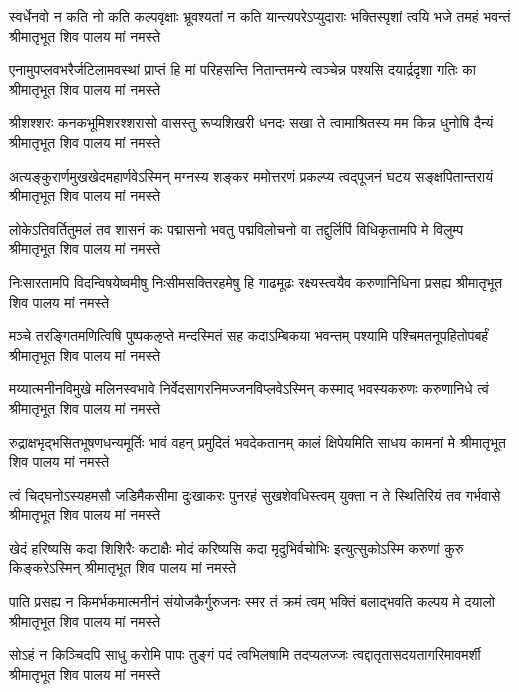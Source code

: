 \fourlineindentedshloka
{स्वर्धेनवो न कति नो कति कल्पवृक्षाः}
{भ्रूवश्यतां न कति यान्त्यपरेऽप्युदाराः}
{भक्तिस्पृशां त्वयि भजे तमहं भवन्तं}
{श्रीमातृभूत शिव पालय मां नमस्ते} %

\fourlineindentedshloka
{एनामुपप्लवभरैर्जटिलामवस्थां}
{प्राप्तं हि मां परिहसन्ति नितान्तमन्ये}
{त्वञ्चेन्न पश्यसि दयार्द्रदृशा गतिः का}
{श्रीमातृभूत शिव पालय मां नमस्ते} %

\fourlineindentedshloka
{श्रीशश्शरः कनकभूमिशरश्शरासो}
{वासस्तु रूप्यशिखरी धनदः सखा ते}
{त्वामाश्रितस्य मम किन्न धुनोषि दैन्यं}
{श्रीमातृभूत शिव पालय मां नमस्ते} %

\fourlineindentedshloka
{अत्यङ्कुरार्णमुखखेदमहार्णवेऽस्मिन्}
{मग्नस्य शङ्कर ममोत्तरणं प्रकल्प्य}
{त्वद्पूजनं घटय सङ्क्षपितान्तरायं}
{श्रीमातृभूत शिव पालय मां नमस्ते} %

\fourlineindentedshloka
{लोकेऽतिवर्तितुमलं तव शासनं कः}
{पद्मासनो भवतु पद्मविलोचनो वा}
{तद्दुर्लिपिं विधिकृतामपि मे विलुम्प}
{श्रीमातृभूत शिव पालय मां नमस्ते} %

\fourlineindentedshloka
{निःसारतामपि विदन्विषयेष्वमीषु}
{निःसीमसक्तिरहमेषु हि गाढमूढः}
{रक्ष्यस्त्वयैव करुणानिधिना प्रसह्य}
{श्रीमातृभूत शिव पालय मां नमस्ते} %

\fourlineindentedshloka
{मञ्चे तरङ्गितमणित्विषि पुष्पकऌप्ते}
{मन्दस्मितं सह कदाऽम्बिकया भवन्तम्}
{पश्यामि पश्चिमतनूपहितोपबर्हं}
{श्रीमातृभूत शिव पालय मां नमस्ते} %

\fourlineindentedshloka
{मय्यात्मनीनविमुखे मलिनस्वभावे}
{निर्वेदसागरनिमज्जनविप्लवेऽस्मिन्}
{कस्माद् भवस्यकरुणः करुणानिधे त्वं}
{श्रीमातृभूत शिव पालय मां नमस्ते} %

\fourlineindentedshloka
{रुद्राक्षभृद्भसितभूषणधन्यमूर्तिः}
{भावं वहन् प्रमुदितं भवदेकतानम्}
{कालं क्षिपेयमिति साधय कामनां मे}
{श्रीमातृभूत शिव पालय मां नमस्ते} %

\fourlineindentedshloka
{त्वं चिद्घनोऽस्यहमसौ जडिमैकसीमा}
{दुःखाकरः पुनरहं सुखशेवधिस्त्वम्}
{युक्ता न ते स्थितिरियं तव गर्भवासे}
{श्रीमातृभूत शिव पालय मां नमस्ते} %

\fourlineindentedshloka
{खेदं हरिष्यसि कदा शिशिरैः कटाक्षैः}
{मोदं करिष्यसि कदा मृदुभिर्वचोभिः}
{ इत्युत्सुकोऽस्मि करुणां कुरु किङ्करेऽस्मिन्}
{श्रीमातृभूत शिव पालय मां नमस्ते} %

\fourlineindentedshloka
{पाति प्रसह्य न किमर्भकमात्मनीनं}
{संयोजकैर्गुरुजनः स्मर तं क्रमं त्वम्}
{भक्तिं बलाद्भवति कल्पय मे दयालो}
{श्रीमातृभूत शिव पालय मां नमस्ते} %

\fourlineindentedshloka
{सोऽहं न किञ्चिदपि साधु करोमि पापः}
{तुङ्गं पदं त्वभिलषामि तदप्यलज्जः}
{त्वद्दातृतासदयतागरिमावमर्शी}
{श्रीमातृभूत शिव पालय मां नमस्ते} %

